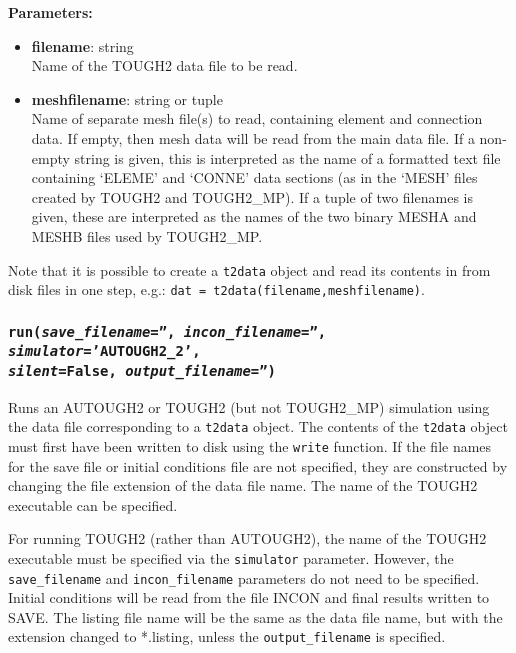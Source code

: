 \textbf{Parameters:}
\begin{itemize}
\item \textbf{filename}: string\\
  Name of the TOUGH2 data file to be read.
\item \textbf{meshfilename}: string or tuple\\
  Name of separate mesh file(s) to read, containing element and connection data.  If empty, then mesh data will be read from the main data file.  If a non-empty string is given, this is interpreted as the name of a formatted text file containing `ELEME' and `CONNE' data sections (as in the `MESH' files created by TOUGH2 and TOUGH2\_MP). If a tuple of two filenames is given, these are interpreted as the names of the two binary MESHA and MESHB files used by TOUGH2\_MP.
\end{itemize}

Note that it is possible to create a \texttt{t2data} object and read its contents in from disk files in one step, e.g.: \texttt{dat = t2data(filename,meshfilename)}.

\begin{snugshade}
\subsubsection{\texttt{run(\emph{save\_filename}='', \emph{incon\_filename}='', \emph{simulator}='AUTOUGH2\_2',\\
    \emph{silent}=False, \emph{output\_filename}='')}}
\end{snugshade}
\label{sec:t2data:run}

Runs an AUTOUGH2 or TOUGH2 (but not TOUGH2\_MP) simulation using the data file corresponding to a \texttt{t2data} object.  The contents of the \texttt{t2data} object must first have been written to disk using the \texttt{write} function.  If the file names for the save file or initial conditions file are not specified, they are constructed by changing the file extension of the data file name.  The name of the TOUGH2 executable can be specified.

For running TOUGH2 (rather than AUTOUGH2), the name of the TOUGH2 executable must be specified via the \texttt{simulator} parameter.  However, the \texttt{save\_filename} and \texttt{incon\_filename} parameters do not need to be specified.  Initial conditions will be read from the file INCON and final results written to SAVE.  The listing file name will be the same as the data file name, but with the extension changed to *.listing, unless the \texttt{output\_filename} is specified.

